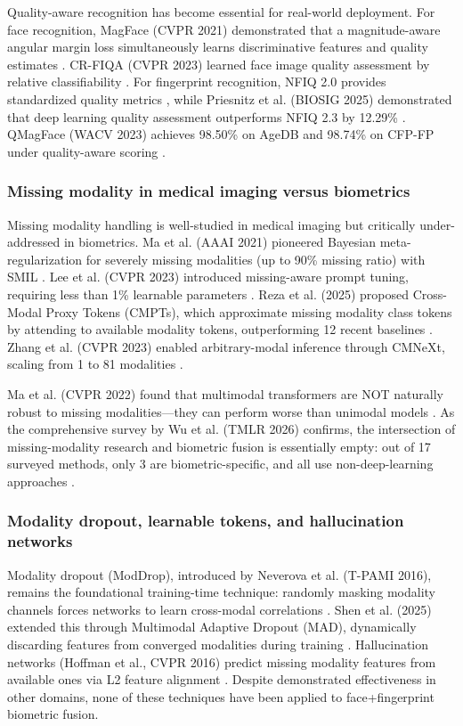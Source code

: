 \documentclass[10pt,journal,compsoc]{IEEEtran}
\begin{document}
Quality-aware recognition has become essential for real-world deployment. For face recognition, MagFace (CVPR 2021) demonstrated that a magnitude-aware angular margin loss simultaneously learns discriminative features and quality estimates \cite{REF34}. CR-FIQA (CVPR 2023) learned face image quality assessment by relative classifiability \cite{REF21}. For fingerprint recognition, NFIQ 2.0 provides standardized quality metrics \cite{REF45}, while Priesnitz et al. (BIOSIG 2025) demonstrated that deep learning quality assessment outperforms NFIQ 2.3 by 12.29\% \cite{REF44}. QMagFace (WACV 2023) achieves 98.50\% on AgeDB and 98.74\% on CFP-FP under quality-aware scoring \cite{REF21}.

\subsubsection{Missing modality in medical imaging versus biometrics}

Missing modality handling is well-studied in medical imaging but critically under-addressed in biometrics. Ma et al. (AAAI 2021) pioneered Bayesian meta-regularization for severely missing modalities (up to 90\% missing ratio) with SMIL \cite{REF6}. Lee et al. (CVPR 2023) introduced missing-aware prompt tuning, requiring less than 1\% learnable parameters \cite{REF5}. Reza et al. (2025) proposed Cross-Modal Proxy Tokens (CMPTs), which approximate missing modality class tokens by attending to available modality tokens, outperforming 12 recent baselines \cite{REF4}. Zhang et al. (CVPR 2023) enabled arbitrary-modal inference through CMNeXt, scaling from 1 to 81 modalities \cite{REF10}.

Ma et al. (CVPR 2022) found that multimodal transformers are NOT naturally robust to missing modalities---they can perform worse than unimodal models \cite{REF3}. As the comprehensive survey by Wu et al. (TMLR 2026) confirms, the intersection of missing-modality research and biometric fusion is essentially empty: out of 17 surveyed methods, only 3 are biometric-specific, and all use non-deep-learning approaches \cite{REF1}.

\subsubsection{Modality dropout, learnable tokens, and hallucination networks}

Modality dropout (ModDrop), introduced by Neverova et al. (T-PAMI 2016), remains the foundational training-time technique: randomly masking modality channels forces networks to learn cross-modal correlations \cite{REF2}. Shen et al. (2025) extended this through Multimodal Adaptive Dropout (MAD), dynamically discarding features from converged modalities during training \cite{REF12}. Hallucination networks (Hoffman et al., CVPR 2016) predict missing modality features from available ones via L2 feature alignment \cite{REF16}. Despite demonstrated effectiveness in other domains, none of these techniques have been applied to face+fingerprint biometric fusion.
\end{document}
